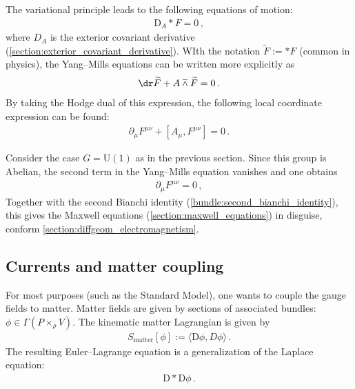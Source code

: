     The variational principle leads to the following equations of motion:
    \begin{gather}
        \label{gauge:YM_equation}
        \mathrm{D}_A\ast F = 0\,,
    \end{gather}
    where $D_A$ is the exterior covariant derivative (\cref{section:exterior_covariant_derivative}). WIth the notation $\widetilde{F}:=\ast F$ (common in physics), the Yang--Mills equations can be written more explicitly as
    \begin{gather}
        \dr\widetilde{F} + A\barwedge\widetilde{F} = 0\,.
    \end{gather}
    By taking the Hodge dual of this expression, the following local coordinate expression can be found:
    \begin{gather}
        \partial_\mu F^{\mu\nu} + [A_\mu,F^{\mu\nu}] = 0\,.
    \end{gather}
    
    \begin{example}[QED]
        Consider the case $G=\mathrm{U}(1)$ as in the previous section. Since this group is Abelian, the second term in the Yang--Mills equation vanishes and one obtains
        \begin{gather}
            \partial_\mu F^{\mu\nu} = 0\,,
        \end{gather}
        Together with the second Bianchi identity (\cref{bundle:second_bianchi_identity}), this gives the Maxwell equations (\cref{section:maxwell_equations}) in disguise, conform \cref{section:diffgeom_electromagnetism}.
    \end{example}

\subsection{Currents and matter coupling}

    For most purposes (such as the Standard Model), one wants to couple the gauge fields to matter. Matter fields are given by sections of associated bundles: $\phi\in\Gamma(P\times_\rho V)$. The kinematic matter Lagrangian is given by
    \begin{gather}
        S_{\text{matter}}[\phi] := \langle\mathrm{D}\phi,D\phi\rangle\,.
    \end{gather}
    The resulting Euler--Lagrange equation is a generalization of the Laplace equation:
    \begin{gather}
        \mathrm{D}\ast\mathrm{D}\phi\,.
    \end{gather}

